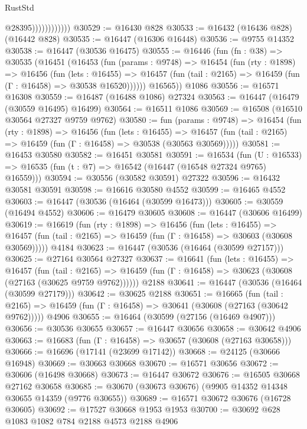 \begin{lexlean}{RustStd}
\begin{coremodule}
                            @28395))))))))))))
@30529 := @16430 @828
@30533 := @16432 (@16436 @828) (@16442 @828)
@30535 := @16447 (@16306 @16448)
@30536 := @9755 @14352
@30538 := @16447 (@30536 @16475)
@30555 := @16446
    (fun (fn : @38) =>
    @30535
      (@16451
        (@16453
          (fun (params : @9748) =>
          @16454
            (fun (rty : @1898) =>
            @16456
              (fun (lets : @16455) =>
              @16457 (fun (tail : @2165) => @16459 (fun (Γ : @16458) => @30538 @16520))))))
        @16565))
    @1086
@30556 := @16571 @16308
@30559 := @16487 (@16488 @1086) @27324
@30563 := @16447 (@16479 (@30559 @16495) @16499)
@30564 := @16511 @1086
@30569 := @16508 (@16510 @30564 @27327 @9759 @9762)
@30580 := fun (params : @9748) =>
  @16454
    (fun (rty : @1898) =>
    @16456
      (fun (lets : @16455) =>
      @16457 (fun (tail : @2165) => @16459 (fun (Γ : @16458) => @30538 (@30563 @30569)))))
@30581 := @16453 @30580
@30582 := @16451 @30581
@30591 := @16534
    (fun (U : @16533) => @16535 (fun (t : @7) => @16542 (@16447 (@16548 @27324 @9765) @16559)))
@30594 := @30556 (@30582 @30591) @27322
@30596 := @16432 @30581 @30591
@30598 := @16616 @30580 @4552
@30599 := @16465 @4552
@30603 := @16447 (@30536 (@16464 (@30599 @16473)))
@30605 := @30559 (@16494 @4552)
@30606 := @16479 @30605
@30608 := @16447 (@30606 @16499)
@30619 := @16619
    (fun (rty : @1898) =>
    @16456
      (fun (lets : @16455) =>
      @16457 (fun (tail : @2165) => @16459 (fun (Γ : @16458) => @30603 (@30608 @30569)))))
    @4184
@30623 := @16447 (@30536 (@16464 (@30599 @27157)))
@30625 := @27164 @30564 @27327
@30637 := @16641
    (fun (lets : @16455) =>
    @16457
      (fun (tail : @2165) =>
      @16459 (fun (Γ : @16458) => @30623 (@30608 (@27163 (@30625 @9759 @9762))))))
    @2188
@30641 := @16447 (@30536 (@16464 (@30599 @27179)))
@30642 := @30625 @2188
@30651 := @16665
    (fun (tail : @2165) => @16459 (fun (Γ : @16458) => @30641 (@30608 (@27163 (@30642 @9762)))))
    @4906
@30655 := @16464 (@30599 (@27156 (@16469 @4907)))
@30656 := @30536 @30655
@30657 := @16447 @30656
@30658 := @30642 @4906
@30663 := @16683 (fun (Γ : @16458) => @30657 (@30608 (@27163 @30658)))
@30666 := @16696 (@17141 (@23699 @17142))
@30668 := @24125 (@30666 @16948)
@30669 := @30663 @30668
@30670 := @16571 @30656
@30672 := @30606 (@16498 @30668)
@30673 := @16447 @30672
@30676 := @16505 @30668 @27162 @30658
@30685 := @30670 (@30673 @30676) (@9905 @14352 @14348 @30655 @14359 (@9776 @30655))
@30689 := @16571 @30672 @30676 (@16728 @30605)
@30692 := @17527 @30668 @1953 @1953
@30700 := @30692 @628 @1083 @1082 @784 @2188 @4573 @2188 @4906

\end{coremodule}
\end{lexlean}
